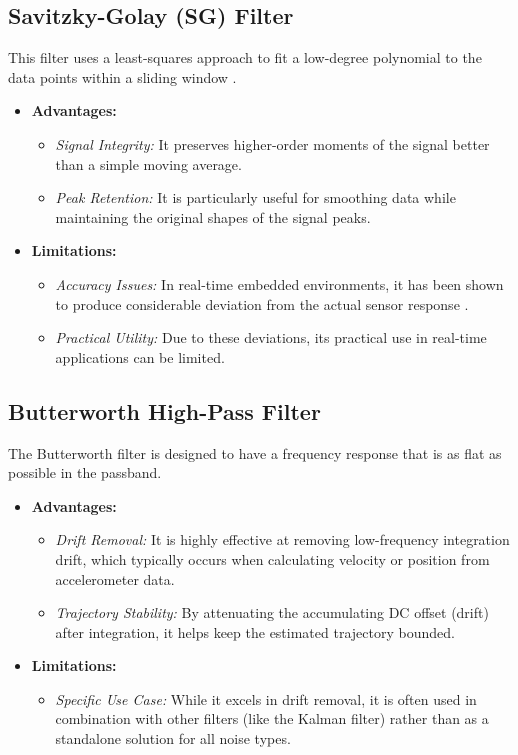 \documentclass[12pt,a4paper]{article}
\begin{document}
\subsection{Savitzky-Golay (SG) Filter}
This filter uses a least-squares approach to fit a low-degree polynomial to the data points within a sliding window \cite{schafer2011}.
\begin{itemize}
    \item \textbf{Advantages:}
    \begin{itemize}
        \item \textit{Signal Integrity:} It preserves higher-order moments of the signal better than a simple moving average.
        \item \textit{Peak Retention:} It is particularly useful for smoothing data while maintaining the original shapes of the signal peaks.
    \end{itemize}
    \item \textbf{Limitations:}
    \begin{itemize}
        \item \textit{Accuracy Issues:} In real-time embedded environments, it has been shown to produce considerable deviation from the actual sensor response \cite{nirmala2016}.
        \item \textit{Practical Utility:} Due to these deviations, its practical use in real-time applications can be limited.
    \end{itemize}
\end{itemize}

\subsection{Butterworth High-Pass Filter}
The Butterworth filter is designed to have a frequency response that is as flat as possible in the passband.
\begin{itemize}
    \item \textbf{Advantages:}
    \begin{itemize}
        \item \textit{Drift Removal:} It is highly effective at removing low-frequency integration drift, which typically occurs when calculating velocity or position from accelerometer data.
        \item \textit{Trajectory Stability:} By attenuating the accumulating DC offset (drift) after integration, it helps keep the estimated trajectory bounded.
    \end{itemize}
    \item \textbf{Limitations:}
    \begin{itemize}
        \item \textit{Specific Use Case:} While it excels in drift removal, it is often used in combination with other filters (like the Kalman filter) rather than as a standalone solution for all noise types.
    \end{itemize}
\end{itemize}
\end{document}
